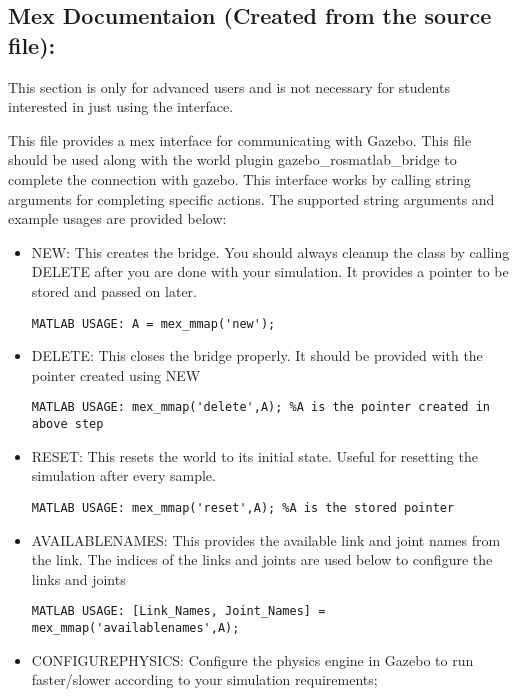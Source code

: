 \documentclass[letterpaper,10pt]{article}
\begin{document}
  
\subsection{Mex Documentaion (Created from the source
file):}\label{mex-documentaion-created-from-the-source-file}
 This section is only for advanced users and is not necessary for students interested in just using the interface.

This file provides a mex interface for communicating with Gazebo. This
file should be used along with the world plugin
gazebo\_rosmatlab\_bridge to complete the connection with gazebo. This
interface works by calling string arguments for completing specific
actions. The supported string arguments and example usages are provided
below: 
\begin{itemize}
\item NEW: This creates the bridge. You should always cleanup the
class by calling DELETE after you are done with your simulation. It
provides a pointer to be stored and passed on later.

\begin{Verbatim}[frame=single]
             MATLAB USAGE: A = mex_mmap('new');
\end{Verbatim}

\item
  DELETE: This closes the bridge properly. It should be provided with
  the pointer created using NEW

\begin{Verbatim}[frame=single]
        MATLAB USAGE: mex_mmap('delete',A); %A is the pointer created in above step
\end{Verbatim}
\item
  RESET: This resets the world to its initial state. Useful for
  resetting the simulation after every sample.

\begin{Verbatim}[frame=single]
        MATLAB USAGE: mex_mmap('reset',A); %A is the stored pointer
\end{Verbatim}
\item
  AVAILABLENAMES: This provides the available link and joint names from
  the link. The indices of the links and joints are used below to
  configure the links and joints

\begin{Verbatim}[frame=single]
        MATLAB USAGE: [Link_Names, Joint_Names] = mex_mmap('availablenames',A);
\end{Verbatim}
\item
  CONFIGUREPHYSICS: Configure the physics engine in Gazebo to run
  faster/slower according to your simulation requirements;


\end{itemize}
\end{document}
